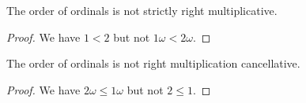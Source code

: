 \documentclass[../../math.tex]{subfiles}
\begin{document}
\begin{theorem}
    The order of ordinals is not strictly right multiplicative.
\end{theorem}
\begin{proof}
    We have $1 < 2$ but not $1 \omega < 2 \omega$.
\end{proof}

\begin{theorem}
    The order of ordinals is not right multiplication cancellative.
\end{theorem}
\begin{proof}
    We have $2 \omega \leq 1 \omega$ but not $2 \leq 1$.
\end{proof}
\end{document}

